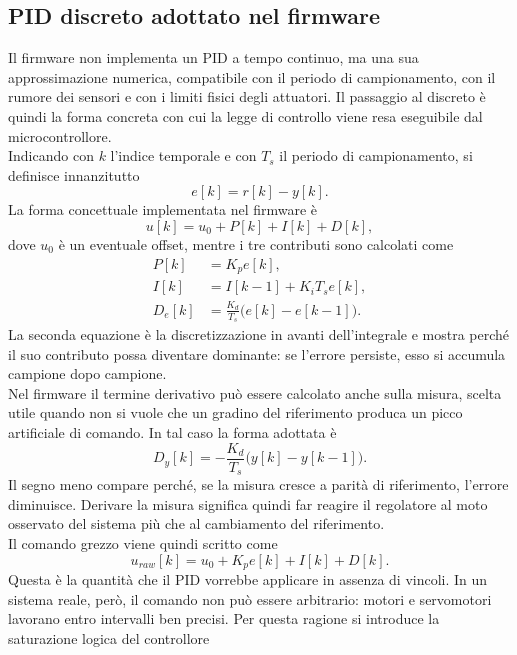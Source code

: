 \documentclass[11pt]{report}
\begin{document}
	\subsection{PID discreto adottato nel firmware}
	Il firmware non implementa un PID a tempo continuo, ma una sua approssimazione numerica, compatibile con il periodo di campionamento, con il rumore dei sensori e con i limiti fisici degli attuatori. Il passaggio al discreto è quindi la forma concreta con cui la legge di controllo viene resa eseguibile dal microcontrollore.\\
	Indicando con $k$ l'indice temporale e con $T_s$ il periodo di campionamento, si definisce innanzitutto
	\begin{equation}
		e[k]=r[k]-y[k].
	\end{equation}
	La forma concettuale implementata nel firmware è
	\begin{equation}
		u[k]=u_0 + P[k] + I[k] + D[k],
	\end{equation}
	dove $u_0$ è un eventuale offset, mentre i tre contributi sono calcolati come
	\begin{align}
		P[k] &= K_p e[k], \\
		I[k] &= I[k-1] + K_i T_s e[k], \\
		D_e[k] &= \frac{K_d}{T_s}\bigl(e[k]-e[k-1]\bigr).
	\end{align}
	La seconda equazione è la discretizzazione in avanti dell'integrale e mostra perché il suo contributo possa diventare dominante: se l'errore persiste, esso si accumula campione dopo campione.\\
	Nel firmware il termine derivativo può essere calcolato anche sulla misura, scelta utile quando non si vuole che un gradino del riferimento produca un picco artificiale di comando. In tal caso la forma adottata è
	\begin{equation}
		D_y[k]= -\frac{K_d}{T_s}\bigl(y[k]-y[k-1]\bigr).
	\end{equation}
	Il segno meno compare perché, se la misura cresce a parità di riferimento, l'errore diminuisce. Derivare la misura significa quindi far reagire il regolatore al moto osservato del sistema più che al cambiamento del riferimento.\\
	Il comando grezzo viene quindi scritto come
	\begin{equation}
		u_{raw}[k]=u_0 + K_p e[k] + I[k] + D[k].
	\end{equation}
	Questa è la quantità che il PID vorrebbe applicare in assenza di vincoli. In un sistema reale, però, il comando non può essere arbitrario: motori e servomotori lavorano entro intervalli ben precisi. Per questa ragione si introduce la saturazione logica del controllore
\end{document}
